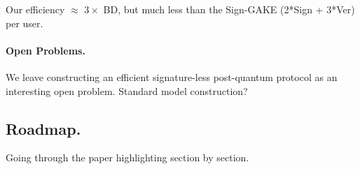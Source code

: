 Our efficiency $\approx$ $3\times $ BD, but much less than the Sign-GAKE (2*Sign + 3*Ver) per user.

\paragraph{Open Problems.}
We leave constructing an efficient signature-less post-quantum \introGAKE protocol as an interesting open problem. 
Standard model construction?


\subsection{Roadmap.}
Going through the paper highlighting section by section.
